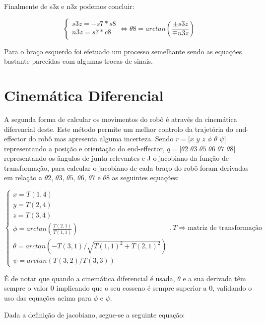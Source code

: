 \documentclass{report}
\begin{document}
Finalmente de s3z e n3z podemos concluir:

\begin{equation}
    \begin{cases}
      s3z = -s7*s8\\
      n3z = s7*c8\\
     \end{cases} \Leftrightarrow \theta 8 = arctan(\frac{\pm s3z}{\mp n3z})
\end{equation}

Para o braço esquerdo foi efetuado um processo semelhante sendo as equações bastante parecidas com algumas trocas de sinais.

\section{Cinemática Diferencial}

A segunda forma de calcular os movimentos do robô é através da cinemática diferencial deste. Este método permite um melhor controlo da trajetória do end-effector do robô mas apresenta alguma incerteza. Sendo $r = [x$ $y$ $z$ $\phi$ $\theta$ $\psi]$ representando a posição e orientação do end-effector, $q = [\theta 2$ $\theta 3$ $\theta 5$ $\theta 6$ $\theta 7$ $\theta 8]$ representando os ângulos de junta relevantes e J o jacobiano da função de transformação, para calcular o jacobiano de cada braço do robô foram derivadas em relação a $\theta 2$, $\theta 3$, $\theta 5$, $\theta 6$, $\theta 7$ e $\theta 8$ as seguintes equações:

\begin{equation}
    \begin{cases}
      x = T(1,4)\\
      y = T(2,4)\\
      z = T(3,4)\\
      \phi = arctan(\frac{T(2,1)}{T(1,1)})\\
      \theta = arctan(-T(3,1)/\sqrt{T(1,1)^2+T(2,1)^2})\\
      \psi = arctan(T(3,2)/T(3,3))
     \end{cases},T \Rightarrow \text{matriz de transformação}
\end{equation}

É de notar que quando a cinemática diferencial é usada, $\theta$ e a sua derivada têm sempre o valor 0 implicando que o seu cosseno é sempre superior a 0, validando o uso das equações acima para $\phi$ e $\psi$.

Dada a definição de jacobiano, segue-se a seguinte equação:
\end{document}
